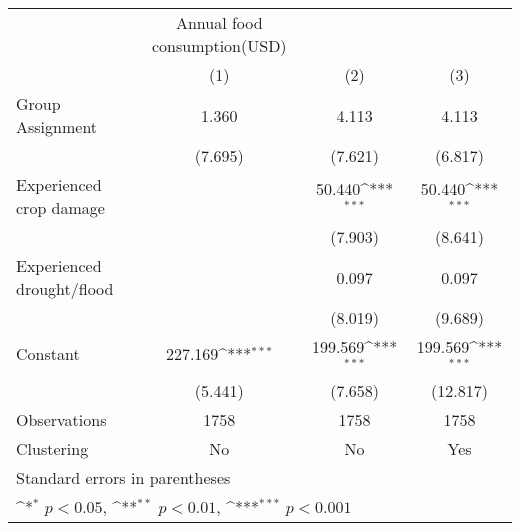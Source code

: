{
\def\sym#1{\ifmmode^{#1}\else\(^{#1}\)\fi}
\begin{tabular}{l*{3}{c}}
\hline\hline
                    &Annual food consumption(USD)                                     \\
                    &\multicolumn{1}{c}{(1)}         &\multicolumn{1}{c}{(2)}         &\multicolumn{1}{c}{(3)}         \\
\hline
Group Assignment    &       1.360         &       4.113         &       4.113         \\
                    &     (7.695)         &     (7.621)         &     (6.817)         \\
[1em]
Experienced crop damage&                     &      50.440\sym{***}&      50.440\sym{***}\\
                    &                     &     (7.903)         &     (8.641)         \\
[1em]
Experienced drought/flood&                     &       0.097         &       0.097         \\
                    &                     &     (8.019)         &     (9.689)         \\
[1em]
Constant            &     227.169\sym{***}&     199.569\sym{***}&     199.569\sym{***}\\
                    &     (5.441)         &     (7.658)         &    (12.817)         \\
\hline
Observations        &        1758         &        1758         &        1758         \\
Clustering          &          No         &          No         &         Yes         \\
\hline\hline
\multicolumn{4}{l}{\footnotesize Standard errors in parentheses}\\
\multicolumn{4}{l}{\footnotesize \sym{*} \(p<0.05\), \sym{**} \(p<0.01\), \sym{***} \(p<0.001\)}\\
\end{tabular}
}

